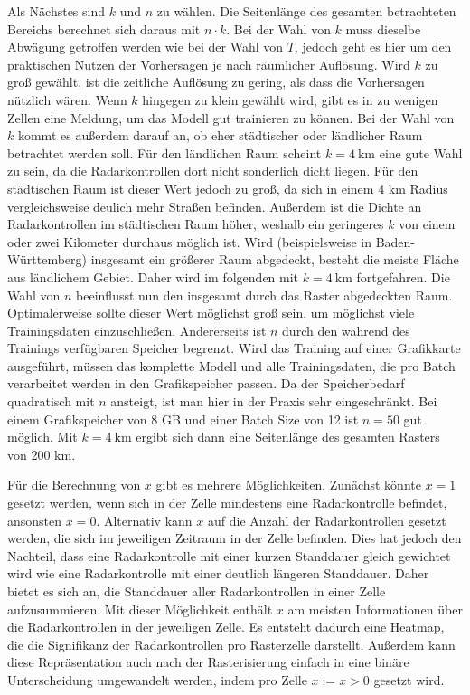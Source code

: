 Als Nächstes sind $k$ und $n$ zu wählen.
Die Seitenlänge des gesamten betrachteten Bereichs berechnet sich daraus mit $n \cdot k$.
Bei der Wahl von $k$ muss dieselbe Abwägung getroffen werden wie bei der Wahl von $T$, jedoch geht es hier um den praktischen Nutzen der Vorhersagen je nach räumlicher Auflösung.
Wird $k$ zu groß gewählt, ist die zeitliche Auflösung zu gering, als dass die Vorhersagen nützlich wären.
Wenn $k$ hingegen zu klein gewählt wird, gibt es in zu wenigen Zellen eine Meldung, um das Modell gut trainieren zu können.
Bei der Wahl von $k$ kommt es außerdem darauf an, ob eher städtischer oder ländlicher Raum betrachtet werden soll.
Für den ländlichen Raum scheint $k = 4~\text{km}$ eine gute Wahl zu sein, da die Radarkontrollen dort nicht sonderlich dicht liegen.
Für den städtischen Raum ist dieser Wert jedoch zu groß, da sich in einem 4 km Radius vergleichsweise deulich mehr Straßen befinden.
Außerdem ist die Dichte an Radarkontrollen im städtischen Raum höher, weshalb ein geringeres $k$ von einem oder zwei Kilometer durchaus möglich ist.
Wird (beispielsweise in Baden-Württemberg) insgesamt ein größerer Raum abgedeckt, besteht die meiste Fläche aus ländlichem Gebiet.
Daher wird im folgenden mit $k = 4~\text{km}$ fortgefahren.
Die Wahl von $n$ beeinflusst nun den insgesamt durch das Raster abgedeckten Raum.
Optimalerweise sollte dieser Wert möglichst groß sein, um möglichst viele Trainingsdaten einzuschließen.
Andererseits ist $n$ durch den während des Trainings verfügbaren Speicher begrenzt.
Wird das Training auf einer Grafikkarte ausgeführt, müssen das komplette Modell und alle Trainingsdaten, die pro Batch verarbeitet werden in den Grafikspeicher passen.
Da der Speicherbedarf quadratisch mit $n$ ansteigt, ist man hier in der Praxis sehr eingeschränkt.
Bei einem Grafikspeicher von 8 GB und einer Batch Size von 12 ist $n = 50$ gut möglich.
Mit $k = 4~\text{km}$ ergibt sich dann eine Seitenlänge des gesamten Rasters von 200 km.

Für die Berechnung von $x$ gibt es mehrere Möglichkeiten.
Zunächst könnte $x = 1$ gesetzt werden, wenn sich in der Zelle mindestens eine Radarkontrolle befindet, ansonsten $x = 0$.
Alternativ kann $x$ auf die Anzahl der Radarkontrollen gesetzt werden, die sich im jeweiligen Zeitraum in der Zelle befinden.
Dies hat jedoch den Nachteil, dass eine Radarkontrolle mit einer kurzen Standdauer gleich gewichtet wird wie eine Radarkontrolle mit einer deutlich längeren Standdauer.
Daher bietet es sich an, die Standdauer aller Radarkontrollen in einer Zelle aufzusummieren.
Mit dieser Möglichkeit enthält $x$ am meisten Informationen über die Radarkontrollen in der jeweiligen Zelle.
Es entsteht dadurch eine Heatmap, die die Signifikanz der Radarkontrollen pro Rasterzelle darstellt.
Außerdem kann diese Repräsentation auch nach der Rasterisierung einfach in eine binäre Unterscheidung umgewandelt werden, indem pro Zelle $x := x > 0$ gesetzt wird.

